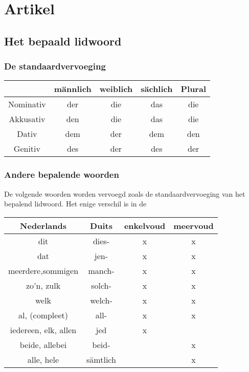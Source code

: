 \documentclass[main.tex]{subfiles}
\begin{document}
\chapter{Artikel}
\section{Het bepaald lidwoord}
\subsection{De standaardvervoeging}
\begin{tabular}{|c|c|c|c|c|}
\hline 
\rowcolor{gray}
 & männlich & weiblich & sächlich & Plural \\ 
\hline 
\cellcolor[gray]{0.8}Nominativ & der & die & das & die \\ 
\hline 
\cellcolor[gray]{0.8}Akkusativ & den & die & das & die \\ 
\hline 
\cellcolor[gray]{0.8}Dativ & dem & der & dem & den \\ 
\hline 
\cellcolor[gray]{0.8}Genitiv & des & der & des & der \\ 
\hline 
\end{tabular} 

\subsection{Andere bepalende woorden}

De volgende woorden worden vervoegd zoals de standaardvervoeging van het bepalend lidwoord. Het enige verschil is in de 

\begin{tabular}{|c|c|c|c|}
\hline 
\rowcolor{gray}
Nederlands & Duits & enkelvoud & meervoud \\ 
\hline 
dit & dies- & x & x \\ 
\hline 
dat & jen- & x & x \\ 
\hline 
meerdere,sommigen & manch- & x & x \\ 
\hline 
zo'n, zulk & solch- & x & x \\ 
\hline 
welk & welch- & x & x \\ 
\hline 
al, (compleet) & all- & x & x \\ 
\hline 
iedereen, elk, allen & jed & x &  \\ 
\hline 
beide, allebei & beid- &  & x \\ 
\hline 
alle, hele & sämtlich &  & x \\ 
\hline 
\end{tabular} 
\end{document}
